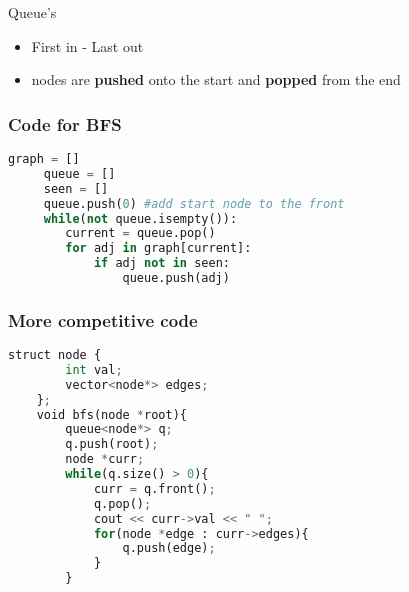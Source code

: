 \documentclass{beamer}
\begin{document}
\begin{frame}{Queue's}
    \begin{itemize}
        \item First in - Last out
        \item nodes are \textbf{pushed} onto the start and \textbf{popped} from the end
    \end{itemize}
    \centering
\end{frame}
\begin{frame}[fragile]
\frametitle{Code for BFS}
     \begin{lstlisting}[language=Python]
     graph = []
     queue = [] 
     seen = [] 
     queue.push(0) #add start node to the front
     while(not queue.isempty()):
        current = queue.pop()
        for adj in graph[current]: 
            if adj not in seen:
                queue.push(adj)
  \end{lstlisting}
\end{frame}
\begin{frame}[fragile]
\frametitle{More competitive code}
    \begin{lstlisting}[language=Python]
    struct node {
        int val;
        vector<node*> edges;
    };
    void bfs(node *root){
        queue<node*> q;
        q.push(root);
        node *curr;
        while(q.size() > 0){
            curr = q.front();
            q.pop();
            cout << curr->val << " ";
            for(node *edge : curr->edges){
                q.push(edge);
            }
        }
 \end{lstlisting}
    
\end{frame}
\end{document}
